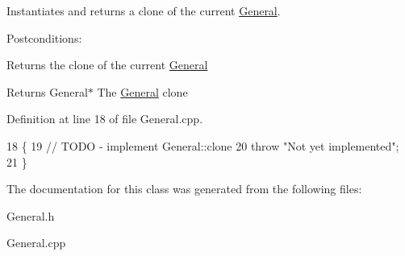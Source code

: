 Instantiates and returns a clone of the current \hyperlink{classGeneral}{General}. 

Postconditions\+:
\begin{DoxyItemize}
\item Returns the clone of the current \hyperlink{classGeneral}{General}
\end{DoxyItemize}

\begin{DoxyReturn}{Returns}
General$\ast$ The \hyperlink{classGeneral}{General} clone 
\end{DoxyReturn}


Definition at line 18 of file General.\+cpp.


\begin{DoxyCode}
18                         \{
19     \textcolor{comment}{// TODO - implement General::clone}
20     \textcolor{keywordflow}{throw} \textcolor{stringliteral}{"Not yet implemented"};
21 \}
\end{DoxyCode}


The documentation for this class was generated from the following files\+:\begin{DoxyCompactItemize}
\item 
General.\+h\item 
General.\+cpp\end{DoxyCompactItemize}
